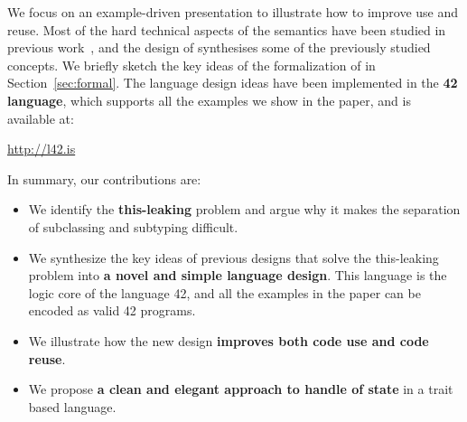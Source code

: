 We focus on an example-driven presentation to illustrate how to
improve use and reuse. Most of the hard technical aspects of the
semantics have been studied in previous 
work~\cite{Bettini:2010:ISP:1774088.1774530,BETTINI2013521,Bettini2015282,KrogdahlMS09,DBLP:journals/taosd/AxelsenSKM12,DBLP:conf/gpce/AxelsenK12,deep,servetto2014meta,fjig},
and the design of \name synthesises some of the previously studied
concepts. We briefly sketch the key ideas of the formalization of
\name in Section~\ref{sec:formal}.
The language design ideas have been implemented in the {\bf 42 language}, which supports all
the examples we show in the paper, and is available at:

\url{http://l42.is}

In summary, our contributions are:







\begin{itemize}
\item We identify the {\bf this-leaking} problem and argue why it
  makes the separation of subclassing and subtyping difficult.
\item We synthesize the key ideas of previous designs that solve the
  this-leaking problem into {\bf a novel and
  simple language design}. This language is the logic core of the language 42, and 
  all the examples in the paper can be encoded as valid 42 programs. 

\item We illustrate how the new design {\bf improves both code use and code
  reuse}.
\item We propose {\bf a clean and elegant approach to handle of state} in a trait based language.

\end{itemize}


\saveSpace
\saveSpace

